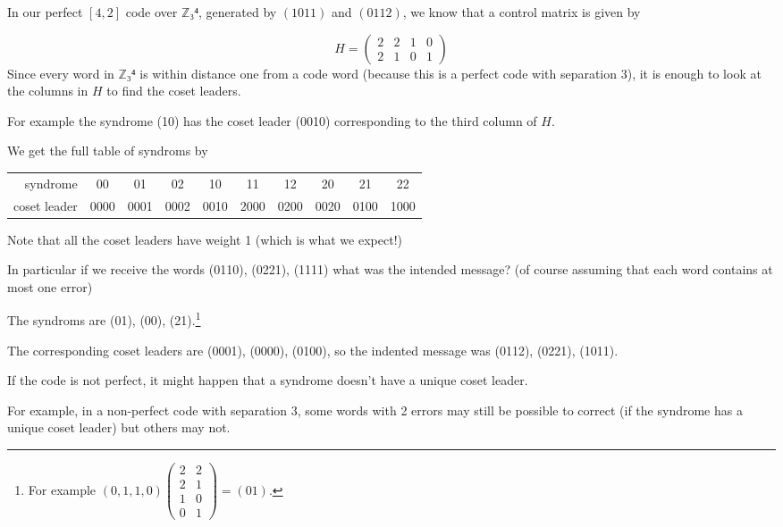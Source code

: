 \documentclass[english]{lbscript}
\begin{document}
\begin{example}{}{}
  In our perfect \([4,2]\) code over \(ℤ₃⁴\), generated by \((1011)\) and \((0112)\), we know that a control matrix is given by

  \begin{equation}
    \label{eq:148}
    H=\begin{pmatrix}
      2 & 2 & 1 & 0 \\
      2 & 1 & 0 & 1
    \end{pmatrix}
  \end{equation}
  Since every word in \(ℤ₃⁴\) is within distance one from a code word (because this is a perfect code with separation 3), it is enough to look at the columns in \(H\) to find the coset leaders.

  For example the syndrome (10) has the coset leader (0010) corresponding to the third column of \(H\).


  We get the full table of syndroms by
  \begin{tabular}{rccccccccc}
    syndrome     & 00   & 01   & 02   & 10   & 11   & 12   & 20   & 21   & 22   \\
    coset leader & 0000 & 0001 & 0002 & 0010 & 2000 & 0200 & 0020 & 0100 & 1000 \\
  \end{tabular}

  Note that all the coset leaders have weight 1 (which is what we expect!)

  In particular if we receive the words (0110), (0221), (1111) what was the intended message? (of course assuming that each word contains at most one error)

  The syndroms are (01), (00), (21).\footnote{For example \((0,1,1,0) \begin{pmatrix}
      2 & 2 \\
      2 & 1 \\
      1 & 0 \\
      0 & 1
    \end{pmatrix}= (0 1)\).}

  The corresponding coset leaders are (0001), (0000), (0100), so the indented message was (0112), (0221), (1011).
\end{example}
\begin{remark}{}{}
  If the code is not perfect, it might happen that a syndrome doesn't have a unique coset leader.

  For example, in a non-perfect code with separation 3, some words with 2 errors may still be possible to correct (if the syndrome has a unique coset leader) but others may not.
\end{remark}
\end{document}
